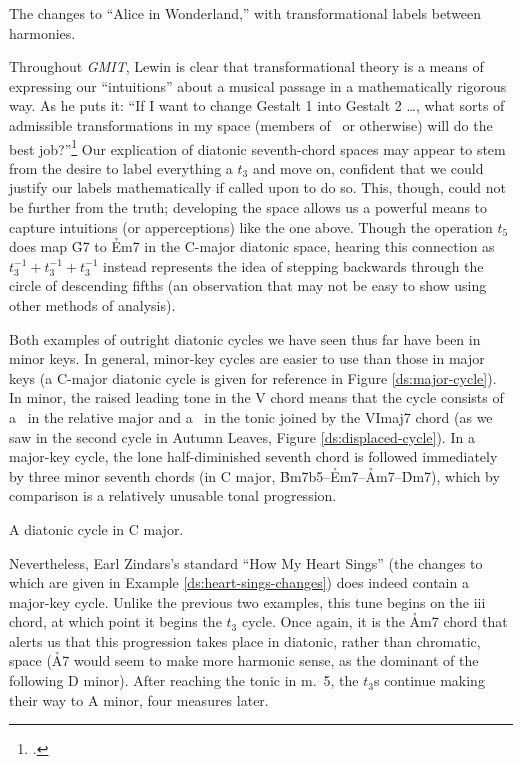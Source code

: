 \documentclass[diss]{subfiles}
\begin{document}
\figBeg[h!btp]
  \caption{The changes to “Alice in Wonderland,” with transformational labels
  between harmonies.}
  \label{ds:wonderland-transformations}
\figEnd

Throughout \emph{GMIT}, Lewin is clear that transformational theory is a means
of expressing our “intuitions” about a musical passage in a mathematically
rigorous way. As he puts it: “If I want to change Gestalt 1 into
Gestalt 2 \ldots, what sorts of admissible transformations in my space
(members of \strans\ or otherwise) will do the best
job?”\footcite[159]{lewin:gmit} Our explication of diatonic seventh-chord
spaces may appear to stem from the desire to label everything a $t_3$ and move
on, confident that we could justify our labels mathematically if called upon
to do so. This, though, could not be further from the truth; developing the
space allows us a powerful means to capture intuitions (or apperceptions) like
the one above. Though the operation $t_5$ does map \h{G7} to \h{Em7} in the
C-major diatonic space, hearing this connection as $t_3^{-1} + t_3^{-1} +
t_3^{-1}$ instead represents the idea of stepping backwards through the circle
of descending fifths (an observation that may not be easy to show using other
methods of analysis).

Both examples of outright diatonic cycles we have seen thus far have been in
minor keys. In general, minor-key cycles are easier to use than those in major
keys (a C-major diatonic cycle is given for reference in Figure
\ref{ds:major-cycle}). In minor, the raised leading tone in the V chord means
that the cycle consists of a \tfo\ in the relative major and a \tfo\ in the
tonic joined by the VImaj7 chord (as we saw in the second cycle in Autumn
Leaves, Figure \ref{ds:displaced-cycle}). In a major-key cycle, the lone
half-diminished seventh chord is followed immediately by three minor seventh
chords (in C major, \h{Bm7b5}--\h{Em7}--\h{Am7}--\h{Dm7}), which by comparison
is a relatively unusable tonal progression.

\figBeg[htbp]
  \caption{A diatonic cycle in C major.}
  \label{ds:major-cycle}
\figEnd

Nevertheless, Earl Zindars’s standard “How My Heart Sings” (the changes to
which are given in Example \ref{ds:heart-sings-changes}) does indeed contain a
major-key cycle. Unlike the previous two examples, this tune begins
on the iii chord, at which point it begins the $t_3$ cycle. Once again, it is
the \h{Am7} chord that alerts us that this progression takes place in
diatonic, rather than chromatic, space (\h{A7} would seem to make more
harmonic sense, as the dominant of the following D minor). After reaching the
tonic in m.~5, the $t_3$s continue making their way to A minor, four measures
later.
\end{document}
